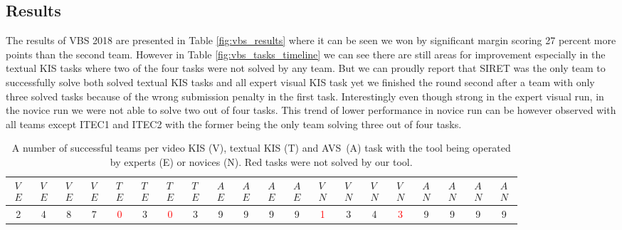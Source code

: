 \subsection{Results}
The results of VBS 2018 are presented in Table \ref{fig:vbs_results} where it can be seen we won by significant margin scoring 27 percent more points than the second team. However in Table \ref{fig:vbs_tasks_timeline} we can see there are still areas for improvement especially in the textual KIS tasks where two of the four tasks were not solved by any team. But we can proudly report that SIRET was the only team to successfully solve both solved textual KIS tasks and all expert visual KIS task yet we finished the round second after a team with only three solved tasks because of the wrong submission penalty in the first task. Interestingly even though strong in the expert visual run, in the novice run we were not able to solve two out of four tasks. This trend of lower performance in novice run can be however observed with all teams except ITEC1 and ITEC2 with the former being the only team solving three out of four tasks.

\begin{table}[h]
	
	\centering
	\begin{tabular}{cccc|cccc|cccc|cccc|cccc}
		\toprule
		$\substack{V \\ E}$ & $\substack{V \\ E}$ & $\substack{V \\ E}$ & $\substack{V \\ E}$ & $\substack{T \\ E}$ & $\substack{T \\ E}$ & $\substack{T \\ E}$ & $\substack{T \\ E}$ & $\substack{A \\ E}$ & $\substack{A \\ E}$ & $\substack{A \\ E}$ & $\substack{A \\ E}$ & $\substack{V \\ N}$ & $\substack{V \\ N}$ & $\substack{V \\ N}$ & $\substack{V \\ N}$ & $\substack{A \\ N}$ & $\substack{A \\ N}$ & $\substack{A \\ N}$ & $\substack{A \\ N}$ \\
		\midrule
		2 & 4 & 8 & 7 & \textcolor{red}{0} & 3 & \textcolor{red}{0} & 3 & 9 & 9 & 9 & 9 & \textcolor{red}{1} & 3 & 4 & \textcolor{red}{3} & 9 & 9 & 9 & 9 \\
		\bottomrule
	\end{tabular}
	
	\caption[Number of successful teams per task at VBS 2018]{A number of successful teams per video KIS (V), textual KIS (T) and AVS~(A) task with the tool being operated by experts (E) or novices (N). Red tasks were not solved by our tool.}
	\label{fig:vbs_tasks}
\end{table}


